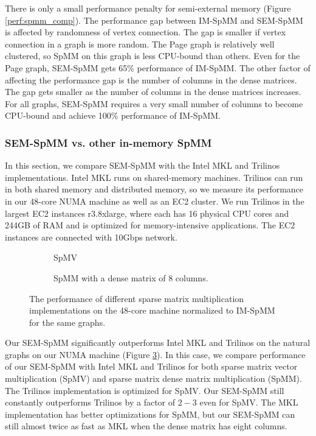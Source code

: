 There is only a small performance penalty for semi-external memory (Figure
\ref{perf:spmm_comp}). The performance gap between IM-SpMM and SEM-SpMM
is affected by randomness of vertex connection. The gap is smaller if
vertex connection in a graph is more random. The Page graph is relatively
well clustered, so SpMM on this graph is less CPU-bound than others.
Even for the Page graph, SEM-SpMM gets 65\% performance of IM-SpMM.
The other factor of affecting the performance gap is the number of columns
in the dense matrices. The gap gets smaller as the number of columns in
the dense matrices increases. For all graphs, SEM-SpMM requires a very small
number of columns to become CPU-bound and achieve 100\% performance of IM-SpMM.

\subsubsection{SEM-SpMM vs. other in-memory SpMM}
In this section, we compare SEM-SpMM with the Intel MKL and Trilinos
implementations. Intel MKL runs on shared-memory machines. Trilinos can run in
both shared memory and distributed memory, so we measure its performance in
our 48-core NUMA machine as well as an EC2 cluster. We run Trilinos in the largest
EC2 instances r3.8xlarge, where each has 16 physical CPU cores and 244GB of RAM
and is optimized for memory-intensive applications. The EC2 instances are
connected with 10Gbps network.

\begin{figure}
	\footnotesize
	\centering
	\begin{subfigure}[b]{0.5\textwidth}
		\centering
		
		\vspace{-10pt}
		\caption{SpMV}
		\label{perf:spmv}
	\end{subfigure}
	\begin{subfigure}[b]{0.5\textwidth}
		\centering
		
		\vspace{-10pt}
		\caption{SpMM with a dense matrix of 8 columns.}
		\label{perf:spmm8}
	\end{subfigure}
	\vspace{3pt}
	\caption{The performance of different sparse matrix multiplication
		implementations on the 48-core machine normalized to IM-SpMM for
	the same graphs.}
	\label{perf:spmm}
\end{figure}

Our SEM-SpMM significantly outperforms Intel MKL and Trilinos on the natural
graphs on our NUMA machine (Figure \ref{perf:spmm}). In this case, we compare
performance of our SEM-SpMM with Intel MKL and Trilinos for both sparse matrix
vector multiplication (SpMV) and sparse matrix dense matrix multiplication (SpMM).
The Trilinos implementation is optimized for SpMV. Our SEM-SpMM still
constantly outperforms Trilinos by a factor of $2-3$ even for SpMV. The MKL
implementation has better optimizations for SpMM, but our SEM-SpMM can still
almost twice as fast as MKL when the dense matrix has eight columns.


